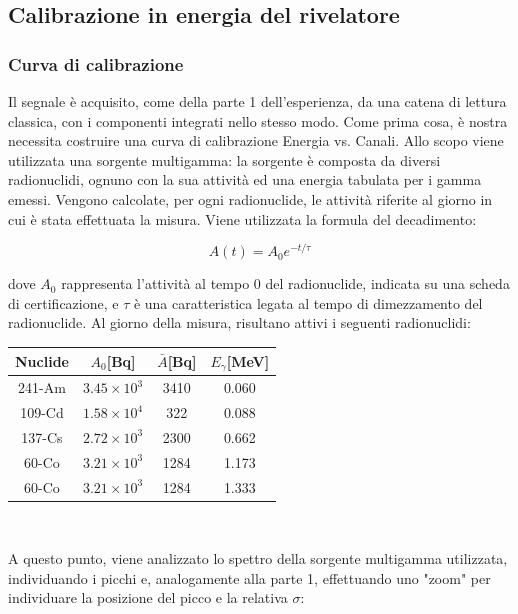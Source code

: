 \documentclass[a4paper,10pt]{article}
\begin{document}
\subsection{Calibrazione in energia del rivelatore}
\subsubsection{Curva di calibrazione}
Il segnale è acquisito, come della parte 1 dell'esperienza, da una catena di lettura classica, con i componenti integrati nello stesso modo. Come prima cosa, è nostra necessita costruire una curva di calibrazione Energia vs. Canali. Allo scopo viene utilizzata una sorgente multigamma: la sorgente è composta da diversi radionuclidi, ognuno con la sua attività ed una energia tabulata per i gamma emessi. Vengono calcolate, per ogni radionuclide, le attività riferite al giorno in cui è stata effettuata la misura. Viene utilizzata la formula del decadimento:

\begin{equation}
	A(t)=A_{0}e^{-t/\tau}
\end{equation}

dove $A_{0}$ rappresenta l'attività al tempo 0 del radionuclide, indicata su una scheda di certificazione, e $\tau$ è una caratteristica legata al tempo di dimezzamento del radionuclide. Al giorno della misura, risultano attivi i seguenti radionuclidi:

\begin{center}
    \begin{tabular}{cccc}
        \toprule
        Nuclide & $A_{0}$[Bq] & $\bar{A}$[Bq] & $E_{\gamma}$[MeV]\\
        \midrule
         241-Am & $3.45 \times 10^3$ & 3410 & 0.060\\
	  109-Cd & $1.58 \times 10^4$ & 322 & 0.088\\
	  137-Cs & $2.72 \times 10^3$ & 2300 & 0.662\\
	  60-Co & $3.21 \times 10^3$ & 1284 & 1.173\\
	  60-Co & $3.21 \times 10^3$ & 1284 & 1.333\\
        \bottomrule
    \end{tabular}\\
\end{center}

A questo punto, viene analizzato lo spettro della sorgente multigamma utilizzata, individuando i picchi e, analogamente alla parte 1, effettuando uno "zoom" per individuare la posizione del picco e la relativa $\sigma$:
\end{document}
